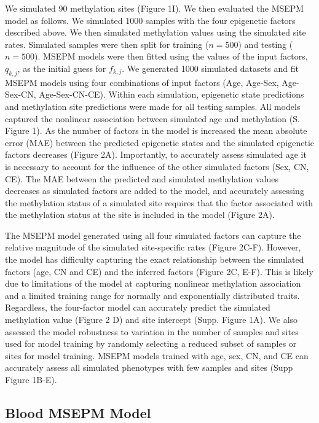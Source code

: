 \documentclass{article}
\begin{document}
{\begin{linenumbers}
We simulated 90 methylation sites (Figure 1I). We then evaluated the MSEPM model as follows. 
We simulated 1000 samples with the four epigenetic factors described above. We then simulated methylation values
 using the simulated site rates. Simulated samples were then split for training ($n=500$) and testing ($n=500$).
  MSEPM models were then fitted using the values of the input factors, $q_{k,j}$, as the initial guess for
   $f_{k,j}$. We generated 1000 simulated datasets and fit MSEPM models using four combinations of input 
   factors (Age, Age-Sex, Age-Sex-CN, Age-Sex-CN-CE). Within each simulation, epigenetic state predictions and 
   methylation site predictions were made for all testing samples. All models captured the nonlinear association 
   between simulated age and methylation (S. Figure 1). As the number of factors in the model is increased the mean 
   absolute error (MAE) between the predicted epigenetic states and the simulated epigenetic factors decreases 
   (Figure 2A). Importantly, to accurately assess simulated age it is necessary to account for the influence of 
   the other simulated factors (Sex, CN, CE). The MAE between the predicted and simulated methylation values decreases 
   as simulated factors are added to the model, and accurately assessing the methylation status of a simulated site 
   requires that the factor associated with the methylation status at the site is included in the model (Figure 2A). 

The MSEPM model generated using all four simulated factors can capture the relative magnitude of the simulated 
site-specific rates (Figure 2C-F).  However, the model has difficulty capturing the exact relationship between the 
simulated factors (age, CN and CE) and the inferred factors (Figure 2C, E-F). This is likely due to limitations of 
the model at capturing nonlinear methylation association and a limited training range for normally and exponentially 
distributed traits. Regardless, the four-factor model can accurately predict the simulated methylation value 
(Figure 2 D) and site intercept (Supp. Figure 1A). We also assessed the model robustness to variation in the 
number of samples and sites used for model training by randomly selecting a reduced subset of samples or sites for 
model training. MSEPM models trained with age, sex, CN, and CE can accurately assess all simulated phenotypes with 
few samples and sites (Supp Figure 1B-E). 

\subsection{Blood MSEPM Model}


\end{linenumbers}}
\end{document}
